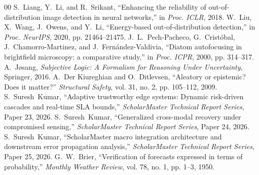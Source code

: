 \documentclass[conference]{IEEEtran}
\begin{document}
\begin{thebibliography}{00}
 S.~Liang, Y.~Li, and R.~Srikant, ``Enhancing the reliability of out-of-distribution image detection in neural networks,'' in \emph{Proc. ICLR}, 2018.
 W.~Liu, X.~Wang, J.~Owens, and Y.~Li, ``Energy-based out-of-distribution detection,'' in \emph{Proc. NeurIPS}, 2020, pp. 21464--21475.
 J.~L.~Pech-Pacheco, G.~Crist{\'o}bal, J.~Chamorro-Martinez, and J.~Fern{\'a}ndez-Valdivia, ``Diatom autofocusing in brightfield microscopy: a comparative study,'' in \emph{Proc. ICPR}, 2000, pp. 314--317.
 A.~J{\o}sang, \emph{Subjective Logic: A Formalism for Reasoning Under Uncertainty}, Springer, 2016.
 A.~Der Kiureghian and O.~Ditlevsen, ``Aleatory or epistemic? Does it matter?'' \emph{Structural Safety}, vol. 31, no. 2, pp. 105--112, 2009.
 S.~Suresh~Kumar, ``Adaptive trustworthy edge systems: Dynamic risk-driven cascades and real-time SLA bounds,'' \emph{ScholarMaster Technical Report Series}, Paper 23, 2026.
 S.~Suresh~Kumar, ``Generalized cross-modal recovery under compromised sensing,'' \emph{ScholarMaster Technical Report Series}, Paper 24, 2026.
 S.~Suresh~Kumar, ``ScholarMaster macro integration architecture and downstream error propagation analysis,'' \emph{ScholarMaster Technical Report Series}, Paper 25, 2026.
 G.~W.~Brier, ``Verification of forecasts expressed in terms of probability,'' \emph{Monthly Weather Review}, vol. 78, no. 1, pp. 1--3, 1950.
\end{thebibliography}
\end{document}
